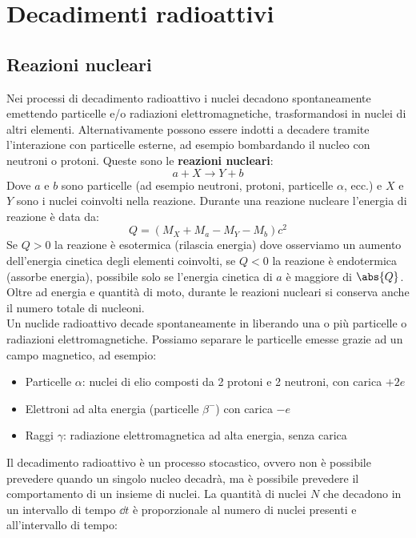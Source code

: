 \chapter{Decadimenti radioattivi}
\section{Reazioni nucleari}
Nei processi di decadimento radioattivo i nuclei decadono spontaneamente emettendo particelle e/o radiazioni elettromagnetiche, trasformandosi in nuclei di altri elementi. Alternativamente possono essere indotti a decadere tramite l'interazione con particelle esterne, ad esempio bombardando il nucleo con neutroni o protoni. Queste sono le \textbf{reazioni nucleari}:
\begin{equation}
    a + X \to Y + b
\end{equation}
Dove $a$ e $b$ sono particelle (ad esempio neutroni, protoni, particelle $\alpha$, ecc.) e $X$ e $Y$ sono i nuclei coinvolti nella reazione. Durante una reazione nucleare l'energia di reazione è data da:
\begin{equation}
    Q = (M_X + M_a - M_Y - M_b)c^2
\end{equation}
Se $Q > 0$ la reazione è esotermica (rilascia energia) dove osserviamo un aumento dell'energia cinetica degli elementi coinvolti, se $Q < 0$ la reazione è endotermica (assorbe energia), possibile solo se l'energia cinetica di $a$ è maggiore di $\abs{Q}$.\\
Oltre ad energia e quantità di moto, durante le reazioni nucleari si conserva anche il numero totale di nucleoni.\\
Un nuclide radioattivo decade spontaneamente in liberando una o più particelle o radiazioni elettromagnetiche. Possiamo separare le particelle emesse grazie ad un campo magnetico, ad esempio:
\begin{itemize}
    \item Particelle $\alpha$: nuclei di elio composti da 2 protoni e 2 neutroni, con carica $+2e$
    \item Elettroni ad alta energia (particelle $\beta^-$) con carica $-e$
    \item Raggi $\gamma$: radiazione elettromagnetica ad alta energia, senza carica
\end{itemize}
Il decadimento radioattivo è un processo stocastico, ovvero non è possibile prevedere quando un singolo nucleo decadrà, ma è possibile prevedere il comportamento di un insieme di nuclei. La quantità di nuclei $N$ che decadono in un intervallo di tempo $\dd{t}$ è proporzionale al numero di nuclei presenti e all'intervallo di tempo:
